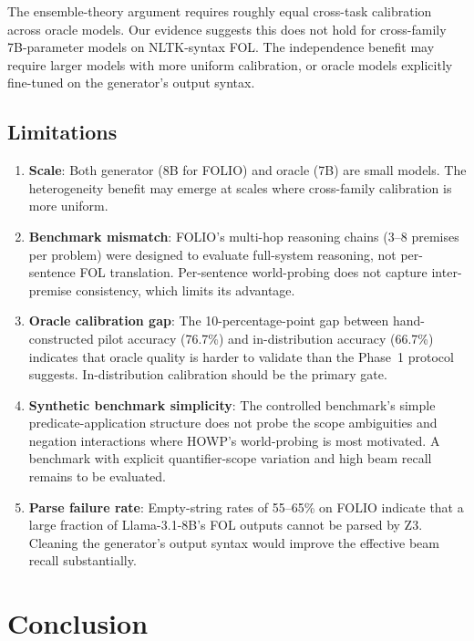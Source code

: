\documentclass[11pt,letterpaper]{article}
\begin{document}
The ensemble-theory argument requires roughly equal cross-task calibration across oracle models. Our evidence suggests this does not hold for cross-family 7B-parameter models on NLTK-syntax FOL. The independence benefit may require larger models with more uniform calibration, or oracle models explicitly fine-tuned on the generator's output syntax.

\subsection{Limitations}

\begin{enumerate}
  \item \textbf{Scale}: Both generator (8B for FOLIO) and oracle (7B) are small models. The heterogeneity benefit may emerge at scales where cross-family calibration is more uniform.
  \item \textbf{Benchmark mismatch}: FOLIO's multi-hop reasoning chains (3--8 premises per problem) were designed to evaluate full-system reasoning, not per-sentence FOL translation. Per-sentence world-probing does not capture inter-premise consistency, which limits its advantage.
  \item \textbf{Oracle calibration gap}: The 10-percentage-point gap between hand-constructed pilot accuracy (76.7\%) and in-distribution accuracy (66.7\%) indicates that oracle quality is harder to validate than the Phase~1 protocol suggests. In-distribution calibration should be the primary gate.
  \item \textbf{Synthetic benchmark simplicity}: The controlled benchmark's simple predicate-application structure does not probe the scope ambiguities and negation interactions where HOWP's world-probing is most motivated. A benchmark with explicit quantifier-scope variation and high beam recall remains to be evaluated.
  \item \textbf{Parse failure rate}: Empty-string rates of 55--65\% on FOLIO indicate that a large fraction of Llama-3.1-8B's FOL outputs cannot be parsed by Z3. Cleaning the generator's output syntax would improve the effective beam recall substantially.
\end{enumerate}

\section{Conclusion}
\end{document}
